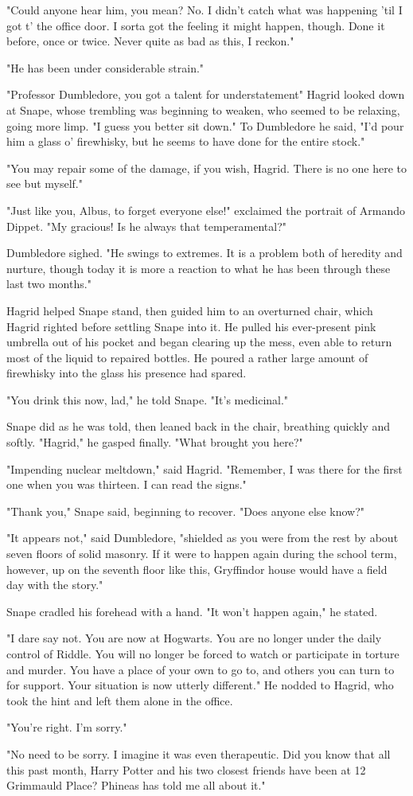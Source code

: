 "Could anyone hear him, you mean? No. I didn't catch what was happening 'til I got t' the office door. I sorta got the feeling it might happen, though. Done it before, once or twice. Never quite as bad as this, I reckon."

"He has been under considerable strain."

"Professor Dumbledore, you got a talent for understatement{\el}" Hagrid looked down at Snape, whose trembling was beginning to weaken, who seemed to be relaxing, going more limp. "I guess you better sit down." To Dumbledore he said, "I'd pour him a glass o' firewhisky, but he seems to have done for the entire stock."

"You may repair some of the damage, if you wish, Hagrid. There is no one here to see but myself."

"Just like you, Albus, to forget everyone else!" exclaimed the portrait of Armando Dippet. "My gracious! Is he always that temperamental?"

Dumbledore sighed. "He swings to extremes. It is a problem both of heredity and nurture, though today it is more a reaction to what he has been through these last two months."

Hagrid helped Snape stand, then guided him to an overturned chair, which Hagrid righted before settling Snape into it. He pulled his ever-present pink umbrella out of his pocket and began clearing up the mess, even able to return most of the liquid to repaired bottles. He poured a rather large amount of firewhisky into the glass his presence had spared.

"You drink this now, lad," he told Snape. "It's medicinal."

Snape did as he was told, then leaned back in the chair, breathing quickly and softly. "Hagrid," he gasped finally. "What brought you here?"

"Impending nuclear meltdown," said Hagrid. "Remember, I was there for the first one when you was thirteen. I can read the signs."

"Thank you," Snape said, beginning to recover. "Does anyone else know?"

"It appears not," said Dumbledore, "shielded as you were from the rest by about seven floors of solid masonry. If it were to happen again during the school term, however, up on the seventh floor like this, Gryffindor house would have a field day with the story."

Snape cradled his forehead with a hand. "It won't happen again," he stated.

"I dare say not. You are now at Hogwarts. You are no longer under the daily control of Riddle. You will no longer be forced to watch or participate in torture and murder. You have a place of your own to go to, and others you can turn to for support. Your situation is now utterly different." He nodded to Hagrid, who took the hint and left them alone in the office.

"You're right. I'm sorry."

"No need to be sorry. I imagine it was even therapeutic. Did you know that all this past month, Harry Potter and his two closest friends have been at 12 Grimmauld Place? Phineas has told me all about it." 


